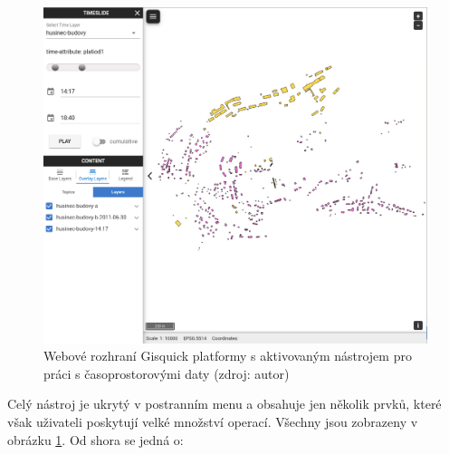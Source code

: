 \begin{figure}[h!]
\centering
\includegraphics[width=1\textwidth]{../img/gisquick-time-tool.png}
\caption{Webové rozhraní Gisquick platformy s aktivovaným nástrojem
pro práci s časoprostorovými daty (zdroj: autor)}
\label{fig:gisquick-client}
\end{figure}

Celý nástroj je ukrytý v postranním menu a obsahuje jen několik prvků,
které však uživateli poskytují velké množství operací. Všechny
jsou zobrazeny v obrázku \ref{fig:gisquick-client}. Od shora se
jedná o:

